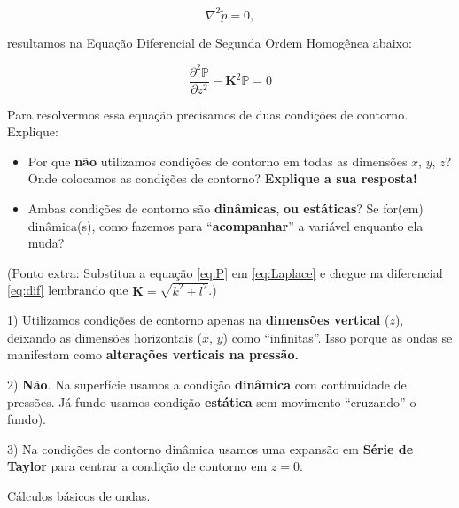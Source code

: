 \documentclass[letterpaper,portuguese,12pt,pdftex]{exam}
\begin{document}
\begin{questions}
\begin{parts}
  \begin{equation}
    \nabla^2 \tilde{p} = 0,
    \label{eq:Laplace}
  \end{equation}

  resultamos na Equação Diferencial de Segunda Ordem Homogênea abaixo:

  \begin{equation}
    \frac{\partial^2\mathbb{P}}{\partial z^2} - \mathbf{K}^2\mathbb{P}=0
    \label{eq:dif}
  \end{equation}

  Para resolvermos essa equação precisamos de duas condições de contorno.
  Explique:

  \begin{itemize}
    \item Por que {\bf não} utilizamos condições de contorno em todas as
          dimensões $x$, $y$, $z$? Onde colocamos as condições de contorno?
          {\bf Explique a sua resposta!}
    \item Ambas condições de contorno são {\bf dinâmicas}, {\bf ou estáticas}?
          Se for(em) dinâmica(s), como fazemos para ``{\bf acompanhar}'' a
          variável enquanto ela muda?
  \end{itemize}

  (Ponto extra: Substitua a equação \ref{eq:P} em \ref{eq:Laplace} e chegue na
  diferencial \ref{eq:dif} lembrando que $\mathbf{K} = \sqrt{k^2 + l^2}$.)

  \begin{solution}
    1) Utilizamos condições de contorno apenas na {\bf dimensões vertical}
    ($z$), deixando as dimensões horizontais ($x$, $y$) como ``infinitas''.
    Isso porque as ondas se manifestam como {\bf alterações verticais na
    pressão.}

    2) {\bf Não}.  Na superfície usamos a condição {\bf dinâmica} com
    continuidade de pressões.  Já fundo usamos condição {\bf estática} sem
    movimento ``cruzando'' o fundo).

    3) Na condições de contorno dinâmica usamos uma expansão em {\bf Série de
    Taylor} para centrar a condição de contorno em $z=0$.
  \end{solution}
\end{parts}

\question
Cálculos básicos de ondas.

\end{questions}
\end{document}
